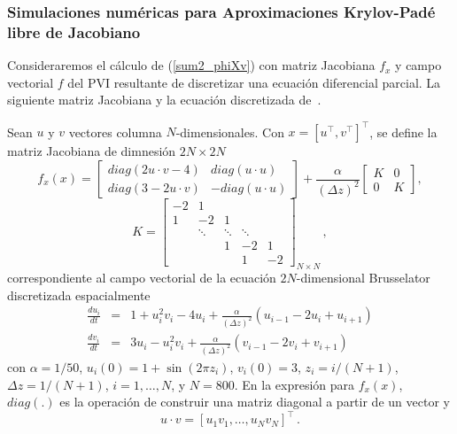 \subsubsection{Simulaciones numéricas para Aproximaciones Krylov-Padé libre de Jacobiano}
Consideraremos el cálculo de (\ref{sum2_phiXv}) con matriz Jacobiana $f_x$ y campo vectorial $f$ del PVI resultante de discretizar una ecuación diferencial parcial. La siguiente matriz Jacobiana y la ecuación discretizada  de~\cite{tokman2006efficient}. 
\begin{example}
	\label{ej:ej1-hpfj} Sean $u$ y $v$ vectores columna $N$-dimensionales. Con $x=[u^{\intercal}, v^{\intercal}]^{\intercal}$, se define la matriz Jacobiana de dimnesión $2N\times2N$
	\begin{equation*}
	f_{x}(x)=\left[ 
	\begin{array}{cc}
	diag(2u\cdot v-4) & diag(u\cdot u) \\ 
	diag(3-2u\cdot v) & -diag(u\cdot u)%
	\end{array}%
	\right] +\frac{\alpha }{(\Delta z)^{2}}\left[ 
	\begin{array}{cc}
	K & 0 \\ 
	0 & K%
	\end{array}%
	\right] ,
	\end{equation*}
	\[
	K=\left[ 
	\begin{array}{ccccc}
	-2 & 1 &  &  & \\
	1 & -2 & 1 &  &  \\
	& \ddots  & \ddots  & \ddots  &  \\
	&  & 1 & -2 & 1 \\
	&  &  & 1 & -2%
	\end{array}%
	\right]_{N\times N} \, ,
	\]
	correspondiente al campo vectorial de la ecuación $2N$-dimensional Brusselator discretizada espacialmente
	\begin{eqnarray*}
		\frac{du_{i}}{dt} &=&1+u_{i}^{2}v_{i}-4u_{i}+\frac{\alpha }{(\Delta z)^{2}}%
		(u_{i-1}-2u_{i}+u_{i+1}) \\
		\frac{dv_{i}}{dt} &=&3u_{i}-u_{i}^{2}v_{i}+\frac{\alpha }{(\Delta z)^{2}}%
		(v_{i-1}-2v_{i}+v_{i+1})
	\end{eqnarray*}
	con $\alpha =1/50$, $u_{i}(0)=1+\sin (2\pi z_{i})$, $v_{i}(0)=3$, $z_{i}=i/(N+1)$, $\Delta z =1/(N+1)$, $i=1,\ldots,N$, y $N=800$. En la expresión para $f_x(x)$, $diag(.)$ es la operación de construir una matriz diagonal a partir de un vector y	
	\[  u \cdot v = [ u_1v_1, \ldots, u_Nv_N]^{\intercal}\, . \]
\end{example}

